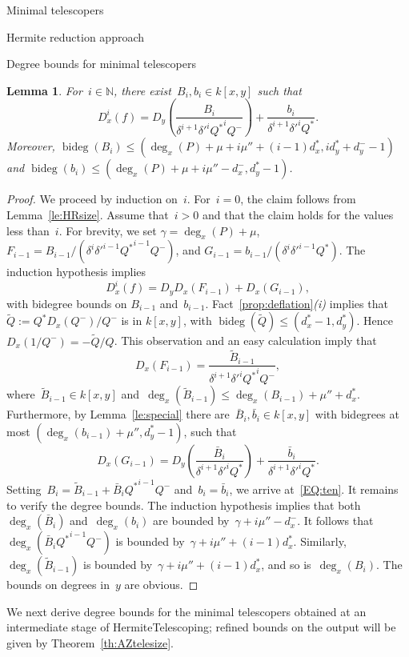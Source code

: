 \documentclass{sig-alt-full}
\newcommand{\bideg}{\operatorname{bideg}}
\newcommand{\bN}{\mathbb{N}}
\newtheorem{lemma}{Lemma}
\begin{document}
\begin{section}{Minimal telescopers}
\begin{subsection}{Hermite reduction approach}
\begin{subsubsection}{Degree bounds for minimal telescopers}
\begin{lemma} \label{le:ithsize}
For~$i\in\bN$, there exist~$B_i, b_i \in k[x,y]$ such that
\begin{equation} \label{EQ:ten}
D_x^i(f) = D_y \left(\frac{B_i}{\delta^{i+1}{\delta'}^i {Q^*}^i Q^-}\right) + \frac{b_i}{\delta^{i+1}{\delta'}^i Q^*}.
\end{equation}
Moreover, $\bideg(B_i)\le (\deg_x(P) + \mu + i\mu'' + (i-1)
d_x^*, id_y^*+d_y^- -1)$ and $\bideg(b_i)\le(\deg_x(P) + \mu
+ i\mu''- d_x^-, d_y^* - 1)$.
\end{lemma}
\begin{proof}
We proceed by induction on~$i$.
For~$i=0$, the claim follows from
Lemma~\ref{le:HRsize}.
Assume that~$i>0$ and that the claim holds
for the values less than~$i$.
For brevity, we set $\gamma= \deg_x(P) + \mu$,
\ $F_{i-1} = B_{i-1}/({\delta}^i{\delta'}^{i-1} {Q^*}^{i-1} Q^-)$,
and $G_{i-1} = b_{i-1}/({\delta}^i{\delta'}^{i-1} Q^*)$.
The induction hypothesis implies
\[D_x^i(f) = D_y D_x (F_{i-1}) + D_x (G_{i-1}),\]
with bidegree bounds on $B_{i-1}$ and~$b_{i-1}$.
Fact~\ref{prop:deflation}\emph{(i)\/} implies that $\tilde{Q} :=
Q^*D_x(Q^-)/Q^-$ is in $k[x, y]$, with
$\bideg(\tilde{Q}) \le (d_x^*-1, d_y^*)$.
Hence $D_x(1/Q^-)=-\tilde{Q}/Q$.
This observation and an easy calculation imply that
\[D_x (F_{i-1}) = \frac{\tilde{B}_{i-1}}{\delta^{i+1}{\delta'}^i {Q^*}^i Q^-},\]
where~$\tilde{B}_{i-1} \in k[x, y]$ and~$\deg_x(
\tilde{B}_{i-1}) \le \deg_x(B_{i-1}) + \mu'' + d_x^*$.
Furthermore, by Lemma~\ref{le:special}
there are~$\bar B_i, \bar b_i \in k[x, y]$ with bidegrees at most
$(\deg_x(b_{i-1}) + \mu'', d_y^*-1)$, such that
\[ D_x(G_{i-1}) = D_y \left( \frac{\bar B_i}{{\delta}^{i+1}{\delta'}^i
Q^*} \right) + \frac{\bar b_i}{{\delta}^{i+1}{\delta'}^i Q^*}. \]
Setting~$B_i=\tilde{B}_{i-1}+\bar B_i{Q^*}^{i-1}Q^-$ and~$b_i=\bar b_i$, we
arrive at~\eqref{EQ:ten}.
It remains to verify the degree bounds.
The induction hypothesis implies that
both $\deg_x(\bar B_i)$ and~$\deg_x(b_i)$ are bounded by~$\gamma + i \mu''  -
d_x^-$.
It follows that $\deg_x(\bar B_i{Q^*}^{i-1}Q^-)$ is
bounded by~$\gamma + i \mu'' + (i-1)d_x^*$.
Similarly,~$\deg_x(\tilde{B}_{i-1})$ is bounded by~$\gamma + i \mu'' +
(i-1)d_x^*$, and so is~$\deg_x (B_i)$.
The bounds on degrees in~$y$ are obvious.
\end{proof}

We next derive degree bounds for the minimal telescopers
obtained at an intermediate stage of \textsf{HermiteTelescoping};
refined bounds on the output will be given by Theorem~\ref{th:AZtelesize}.


\end{subsubsection}
\end{subsection}
\end{section}
\end{document}
